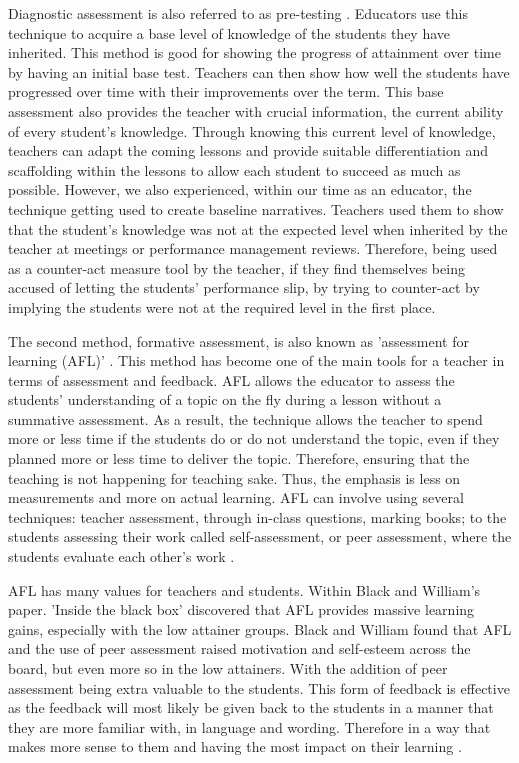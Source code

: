 		Diagnostic assessment is also referred to as pre-testing \cite{wellington2007secondary}. Educators use this technique to acquire a base level of knowledge of the students they have inherited. This method is good for showing the progress of attainment over time by having an initial base test. Teachers can then show how well the students have progressed over time with their improvements over the term. This base assessment also provides the teacher with crucial information, the current ability of every student's knowledge. Through knowing this current level of knowledge, teachers can adapt the coming lessons and provide suitable differentiation and scaffolding within the lessons to allow each student to succeed as much as possible. However, we also experienced, within our time as an educator, the technique getting used to create baseline narratives. Teachers used them to show that the student's knowledge was not at the expected level when inherited by the teacher at meetings or performance management reviews. Therefore, being used as a counter-act measure tool by the teacher, if they find themselves being accused of letting the students' performance slip, by trying to counter-act by implying the students were not at the required level in the first place.
	
		The second method, formative assessment, is also known as 'assessment for learning (AFL)' \cite{wellington2007secondary, dillon2011becoming}. This method has become one of the main tools for a teacher in terms of assessment and feedback. AFL allows the educator to assess the students' understanding of a topic on the fly during a lesson without a summative assessment. As a result, the technique allows the teacher to spend more or less time if the students do or do not understand the topic, even if they planned more or less time to deliver the topic. Therefore, ensuring that the teaching is not happening for teaching sake. Thus, the emphasis is less on measurements and more on actual learning. AFL can involve using several techniques: teacher assessment, through in-class questions, marking books; to the students assessing their work called self-assessment, or peer assessment, where the students evaluate each other's work \cite{wellington2007secondary}.
	
		AFL has many values for teachers and students. Within Black and William's paper. 'Inside the black box' \cite{black1998inside} discovered that AFL provides massive learning gains, especially with the low attainer groups. Black and William found that AFL and the use of peer assessment raised motivation and self-esteem across the board, but even more so in the low attainers. With the addition of peer assessment being extra valuable to the students. This form of feedback is effective as the feedback will most likely be given back to the students in a manner that they are more familiar with, in language and wording. Therefore in a way that makes more sense to them and having the most impact on their learning \cite{torrance1998investigating, black1998inside}.
	
